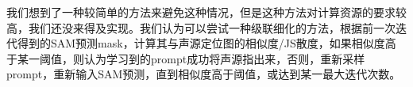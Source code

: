 \documentclass[12pt]{article}
\begin{document}
我们想到了一种较简单的方法来避免这种情况，但是这种方法对计算资源的要求较高，我们还没来得及实现。我们认为可以尝试一种级联细化的方法，根据前一次迭代得到的SAM预测mask，计算其与声源定位图的相似度/JS散度，如果相似度高于某一阈值，则认为学习到的prompt成功将声源指出来，否则，重新采样prompt，重新输入SAM预测，直到相似度高于阈值，或达到某一最大迭代次数。
\begin{figure}[!h]
  \centering
\end{figure}
\end{document}
